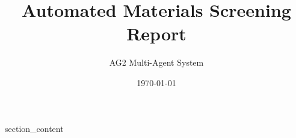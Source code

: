 \documentclass{article}
\title{Automated Materials Screening Report}
\author{AG2 Multi-Agent System}
\date{\today}
\begin{document}
\maketitle

{section_content}
\end{document}
